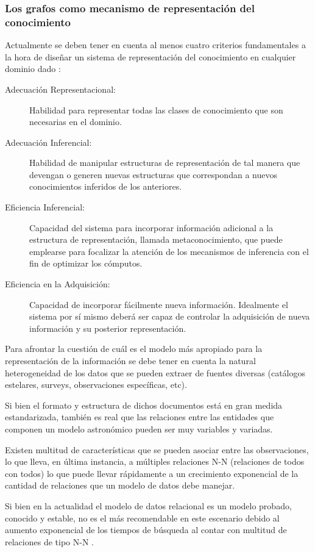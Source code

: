 \documentclass[
	11pt,oneside,a4paper,
	fleqn,
	article
]{memoir}
\begin{document}
\subsubsection{Los grafos como mecanismo de representación del conocimiento}

Actualmente se deben tener en cuenta al menos cuatro criterios fundamentales a la hora de diseñar un sistema de representación del conocimiento en cualquier dominio dado  \parencite{van2008handbook}:

\begin{description}
	\item [Adecuación Representacional:] Habilidad para representar todas las clases de conocimiento que son necesarias en el dominio.
	\item [Adecuación Inferencial:] Habilidad de manipular estructuras de representación de tal manera que devengan o generen nuevas estructuras que correspondan a nuevos conocimientos inferidos de los anteriores.
	\item [Eficiencia Inferencial:] Capacidad del sistema para incorporar información adicional a la estructura de representación, llamada metaconocimiento, que puede emplearse para focalizar la atención de los mecanismos de inferencia con el fin de optimizar los cómputos.
	\item [Eficiencia en la Adquisición:] Capacidad de incorporar fácilmente nueva información. Idealmente el sistema por sí mismo deberá ser capaz de controlar la adquisición de nueva información y su posterior representación.
\end{description}

Para afrontar la cuestión de cuál es el modelo más apropiado para la representación de la información se debe tener en cuenta la natural heterogeneidad de los datos que se pueden extraer de fuentes diversas (catálogos estelares, surveys, observaciones específicas, etc). 

Si bien el formato y estructura de dichos documentos está en gran medida estandarizada, también es real que las relaciones entre las entidades que componen un modelo astronómico pueden ser muy variables y variadas. 

Existen multitud de características que se pueden asociar entre las observaciones, lo que lleva, en última instancia, a múltiples relaciones N-N (relaciones de todos con todos) lo que puede llevar rápidamente a un crecimiento exponencial de la cantidad de relaciones que un modelo de datos debe manejar.

Si bien en la actualidad el modelo de datos relacional es un modelo probado, conocido y estable, no es el más recomendable en este escenario debido al aumento exponencial de los tiempos de búsqueda al contar con multitud de relaciones de tipo N-N  \parencite{kunii1987dbms}. 
\end{document}
